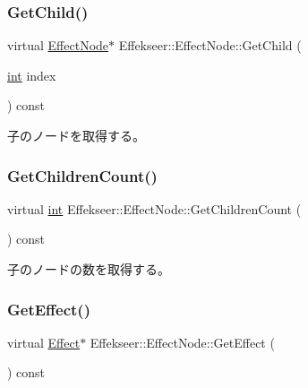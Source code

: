 \subsubsection{\texorpdfstring{Get\+Child()}{GetChild()}}
{\footnotesize\ttfamily virtual \mbox{\hyperlink{class_effekseer_1_1_effect_node}{Effect\+Node}}$\ast$ Effekseer\+::\+Effect\+Node\+::\+Get\+Child (\begin{DoxyParamCaption}\item[{\mbox{\hyperlink{namespace_effekseer_ace0abf7c2e6947e519ebe8b54cbcc30a}{int}}}]{index }\end{DoxyParamCaption}) const\hspace{0.3cm}{\ttfamily [pure virtual]}}



子のノードを取得する。 

\mbox{\label{class_effekseer_1_1_effect_node_a195d5b29060452c7d4d4d5c376987c4f}} 
\subsubsection{\texorpdfstring{Get\+Children\+Count()}{GetChildrenCount()}}
{\footnotesize\ttfamily virtual \mbox{\hyperlink{namespace_effekseer_ace0abf7c2e6947e519ebe8b54cbcc30a}{int}} Effekseer\+::\+Effect\+Node\+::\+Get\+Children\+Count (\begin{DoxyParamCaption}{ }\end{DoxyParamCaption}) const\hspace{0.3cm}{\ttfamily [pure virtual]}}



子のノードの数を取得する。 

\mbox{\label{class_effekseer_1_1_effect_node_a82cd29e3b7d4f56bae4f95d3ac1d25a7}} 
\subsubsection{\texorpdfstring{Get\+Effect()}{GetEffect()}}
{\footnotesize\ttfamily virtual \mbox{\hyperlink{class_effekseer_1_1_effect}{Effect}}$\ast$ Effekseer\+::\+Effect\+Node\+::\+Get\+Effect (\begin{DoxyParamCaption}{ }\end{DoxyParamCaption}) const\hspace{0.3cm}{\ttfamily [pure virtual]}}



